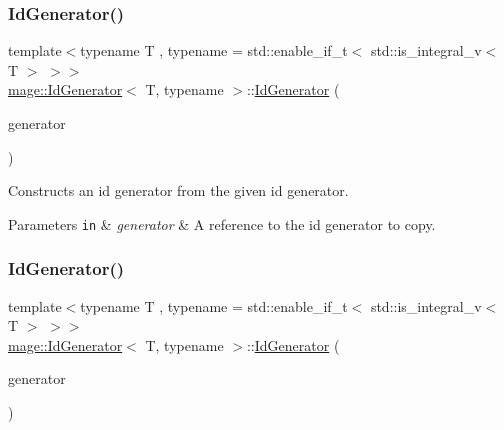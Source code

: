 \subsubsection{\texorpdfstring{Id\+Generator()}{IdGenerator()}\hspace{0.1cm}{\footnotesize\ttfamily [2/3]}}
{\footnotesize\ttfamily template$<$typename T , typename  = std\+::enable\+\_\+if\+\_\+t$<$ std\+::is\+\_\+integral\+\_\+v$<$ T $>$ $>$$>$ \\
\mbox{\hyperlink{classmage_1_1_id_generator}{mage\+::\+Id\+Generator}}$<$ T, typename $>$\+::\mbox{\hyperlink{classmage_1_1_id_generator}{Id\+Generator}} (\begin{DoxyParamCaption}\item[{const \mbox{\hyperlink{classmage_1_1_id_generator}{Id\+Generator}}$<$ T, typename $>$ \&}]{generator }\end{DoxyParamCaption})\hspace{0.3cm}{\ttfamily [delete]}}

Constructs an id generator from the given id generator.


\begin{DoxyParams}[1]{Parameters}
\mbox{\tt in}  & {\em generator} & A reference to the id generator to copy. \\
\hline
\end{DoxyParams}
\mbox{\label{classmage_1_1_id_generator_a65f85b6d0858865a346f93876ad121b5}} 
\subsubsection{\texorpdfstring{Id\+Generator()}{IdGenerator()}\hspace{0.1cm}{\footnotesize\ttfamily [3/3]}}
{\footnotesize\ttfamily template$<$typename T , typename  = std\+::enable\+\_\+if\+\_\+t$<$ std\+::is\+\_\+integral\+\_\+v$<$ T $>$ $>$$>$ \\
\mbox{\hyperlink{classmage_1_1_id_generator}{mage\+::\+Id\+Generator}}$<$ T, typename $>$\+::\mbox{\hyperlink{classmage_1_1_id_generator}{Id\+Generator}} (\begin{DoxyParamCaption}\item[{\mbox{\hyperlink{classmage_1_1_id_generator}{Id\+Generator}}$<$ T, typename $>$ \&\&}]{generator }\end{DoxyParamCaption})\hspace{0.3cm}{\ttfamily [delete]}}

